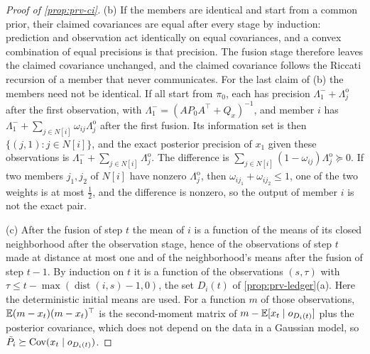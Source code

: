 \begin{proof}[Proof of \cref{prop:prv-ci}]
(b) If the members are identical and start from a common prior, their claimed covariances are equal after every stage by induction: prediction and observation act identically on equal covariances, and a convex combination of equal precisions is that precision. The fusion stage therefore leaves the claimed covariance unchanged, and the claimed covariance follows the Riccati recursion of a member that never communicates. For the last claim of (b) the members need not be identical. If all start from $\pi_0$, each has precision $\Lambda_1^-+\Lambda^{\mathrm o}_j$ after the first observation, with $\Lambda_1^-=(AP_0A^\top+Q_x)^{-1}$, and member $i$ has $\Lambda_1^-+\sum_{j\in N[i]}\omega_{ij}\Lambda^{\mathrm o}_j$ after the first fusion. Its information set is then $\{(j,1):j\in N[i]\}$, and the exact posterior precision of $x_1$ given these observations is $\Lambda_1^-+\sum_{j\in N[i]}\Lambda^{\mathrm o}_j$. The difference is $\sum_{j\in N[i]}(1-\omega_{ij})\Lambda^{\mathrm o}_j\succeq0$. If two members $j_1,j_2$ of $N[i]$ have nonzero $\Lambda^{\mathrm o}_j$, then $\omega_{ij_1}+\omega_{ij_2}\le1$, one of the two weights is at most $\frac12$, and the difference is nonzero, so the output of member $i$ is not the exact pair.

(c) After the fusion of step $t$ the mean of $i$ is a function of the means of its closed neighborhood after the observation stage, hence of the observations of step $t$ made at distance at most one and of the neighborhood's means after the fusion of step $t-1$. By induction on $t$ it is a function of the observations $(s,\tau)$ with $\tau\le t-\max(\operatorname{dist}(i,s)-1,0)$, the set $D_i(t)$ of \cref{prop:prv-ledger}(a). Here the deterministic initial means are used. For a function $m$ of those observations, $\mathbb{E}(m-x_t)(m-x_t)^\top$ is the second-moment matrix of $m-\mathbb{E}[x_t\mid o_{D_i(t)}]$ plus the posterior covariance, which does not depend on the data in a Gaussian model, so $\tilde P_i\succeq\operatorname{Cov}(x_t\mid o_{D_i(t)})$.


\end{proof}
